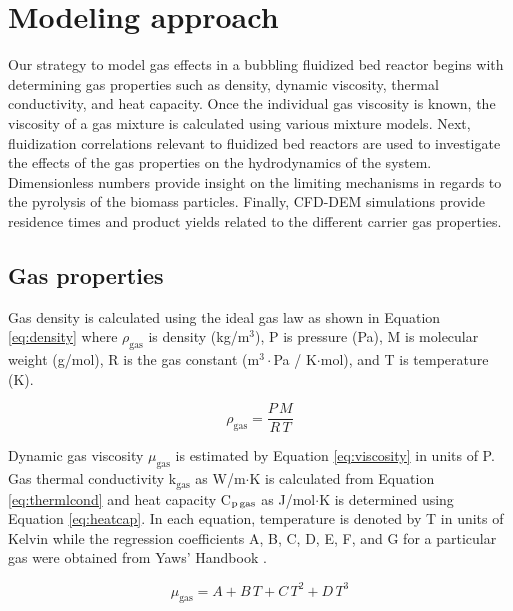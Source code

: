
\section{Modeling approach}

Our strategy to model gas effects in a bubbling fluidized bed reactor begins with determining gas properties such as density, dynamic viscosity, thermal conductivity, and heat capacity. Once the individual gas viscosity is known, the viscosity of a gas mixture is calculated using various mixture models. Next, fluidization correlations relevant to fluidized bed reactors are used to investigate the effects of the gas properties on the hydrodynamics of the system. Dimensionless numbers provide insight on the limiting mechanisms in regards to the pyrolysis of the biomass particles. Finally, CFD-DEM simulations provide residence times and product yields related to the different carrier gas properties.


\subsection{Gas properties}

Gas density is calculated using the ideal gas law as shown in Equation \ref{eq:density} where $\rho_\text{gas}$ is density (kg/m$^3$), P is pressure (Pa), M is molecular weight (g/mol), R is the gas constant (m$^3\cdot$Pa / K$\cdot$mol), and T is temperature (K).

\begin{equation}\label{eq:density}
    \rho_\text{gas} = \frac{P\,M}{R\,T}
\end{equation}

Dynamic gas viscosity $\mu_\text{gas}$ is estimated by Equation \ref{eq:viscosity} in units of \textmugreek P. Gas thermal conductivity k$_\text{gas}$ as W/m$\cdot$K is calculated from Equation \ref{eq:thermlcond} and heat capacity C$_\text{p\,gas}$ as J/mol$\cdot$K is determined using Equation \ref{eq:heatcap}. In each equation, temperature is denoted by T in units of Kelvin while the regression coefficients A, B, C, D, E, F, and G for a particular gas were obtained from Yaws' Handbook \cite{Yaws2014}.

\begin{equation}\label{eq:viscosity}
    \mu_\text{gas} = A + B\,T + C\,T^2 + D\,T^3
\end{equation}

